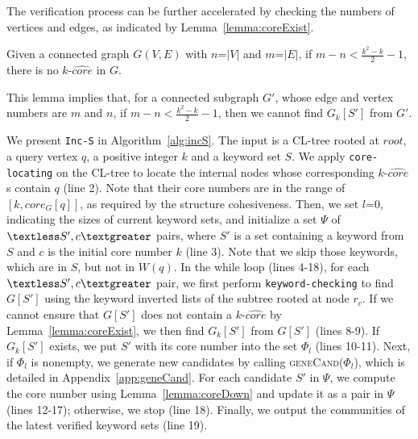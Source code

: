 The verification process can be further accelerated by checking the numbers of vertices and edges,
as indicated by Lemma~\ref{lemma:coreExist}.
\begin{lemma}
\label{lemma:coreExist}
  Given a connected graph $G(V,E)$ with $n$=$|V|$ and $m$=$|E|$,
  if $m - n < \frac{{{k^2} - k}}{2} - 1$, there is no $k$-$\widehat {core}$ in $G$.
\end{lemma}

This lemma implies that, for a connected subgraph $G'$, whose edge and vertex numbers are $m$ and $n$,
if $m - n < \frac{{{k^2} - k}}{2} - 1$, then we cannot find $G_k[S']$ from $G'$.

We present {\tt Inc-S} in Algorithm~\ref{alg:incS}.
The input is a CL-tree rooted at $root$, a query vertex $q$, a positive integer $k$ and a keyword set $S$.
We apply {\tt core-locating} on the CL-tree to locate the internal nodes whose corresponding $k$-$\widehat {core}$s contain $q$ (line 2).
Note that their core numbers are in the range of $[k,core_G[q]]$, as required by the structure cohesiveness.
Then, we set $l$=0, indicating the sizes of current keyword sets, and initialize a set $\Psi$ of $\textless S',c\textgreater$ pairs,
where $S'$ is a set containing a keyword from $S$ and $c$ is the initial core number $k$ (line 3).
Note that we skip those keywords, which are in $S$, but not in $W(q)$.
In the while loop (lines 4-18), for each $\textless S',c\textgreater$ pair,
we first perform {\tt keyword-checking} to find $G[S']$ using the keyword inverted lists of the subtree rooted at node $r_c$.
If we cannot ensure that $G[S']$ does not contain a $k$-$\widehat {core}$ by Lemma~\ref{lemma:coreExist},
we then find $G_k[S']$ from $G[S']$ (lines 8-9).
If $G_k[S']$ exists, we put $S'$ with its core number into the set $\Phi_l$ (lines 10-11).
Next, if $\Phi_l$ is nonempty, we generate new candidates by calling \textsc{geneCand($\Phi_{l}$)},
which is detailed in Appendix~\ref{app:geneCand}.
For each candidate $S'$ in $\Psi$, we compute the core number using Lemma~\ref{lemma:coreDown}
and update it as a pair in $\Psi$ (lines 12-17);
otherwise, we stop (line 18).
Finally, we output the communities of the latest verified keyword sets (line 19).

